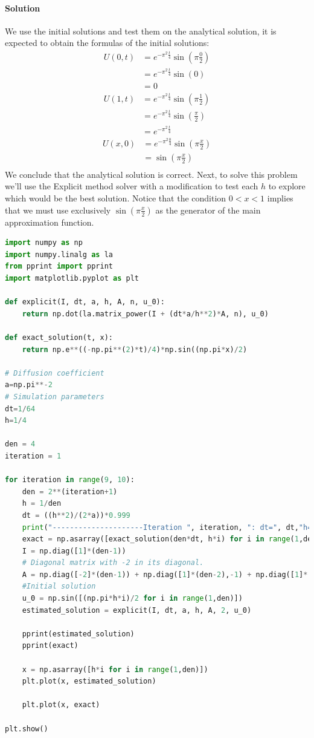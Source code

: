 \documentclass{article}
\begin{document}
\paragraph{Solution} We use the initial solutions and test them on the analytical solution, it is expected to obtain the formulas of the initial solutions:
\begin{align*}
	U(0,t) &= e^{-\pi^2 \frac{t}{4}} \sin{\left(\pi \frac{0}{2}\right)}\\
	&= e^{-\pi^2 \frac{t}{4}}\sin{(0)}\\
	&= 0
\end{align*}
\begin{align*}
	U(1,t) &= e^{-\pi^2 \frac{t}{4}} \sin{\left(\pi \frac{1}{2}\right)}\\
	&= e^{-\pi^2 \frac{t}{4}}\sin{\left(\frac{\pi}{2}\right)}\\
	&= e^{-\pi^2 \frac{t}{4}}
\end{align*}
\begin{align*}
U(x,0) &= e^{-\pi^2 \frac{0}{4}} \sin{\left(\pi \frac{x}{2}\right)}\\
&= \sin{\left(\pi\frac{x}{2}\right)}\\
\end{align*}
We conclude that the analytical solution is correct. Next, to solve this problem we'll use the Explicit method solver with a modification to test each $h$ to explore which would be the best solution. Notice that the condition $0 < x < 1$ implies that we must use exclusively $\sin{\left(\pi \frac{x}{2}\right)}$ as the generator of the main approximation function.
\begin{lstlisting}[language=python]
import numpy as np
import numpy.linalg as la
from pprint import pprint
import matplotlib.pyplot as plt

def explicit(I, dt, a, h, A, n, u_0):
	return np.dot(la.matrix_power(I + (dt*a/h**2)*A, n), u_0)

def exact_solution(t, x):
	return np.e**((-np.pi**(2)*t)/4)*np.sin((np.pi*x)/2)

# Diffusion coefficient
a=np.pi**-2
# Simulation parameters
dt=1/64
h=1/4

den = 4
iteration = 1

for iteration in range(9, 10):
	den = 2**(iteration+1)
	h = 1/den
	dt = ((h**2)/(2*a))*0.999
	print("---------------------Iteration ", iteration, ": dt=", dt,"h=1/",den)
	exact = np.asarray([exact_solution(den*dt, h*i) for i in range(1,den)])
	I = np.diag([1]*(den-1))
	# Diagonal matrix with -2 in its diagonal.	
	A = np.diag([-2]*(den-1)) + np.diag([1]*(den-2),-1) + np.diag([1]*(den-2),1)
	#Initial solution
	u_0 = np.sin([(np.pi*h*i)/2 for i in range(1,den)])
	estimated_solution = explicit(I, dt, a, h, A, 2, u_0)
	
	pprint(estimated_solution)
	pprint(exact)
	
	x = np.asarray([h*i for i in range(1,den)])
	plt.plot(x, estimated_solution)
	
	plt.plot(x, exact)

plt.show()
\end{lstlisting}
\end{document}

